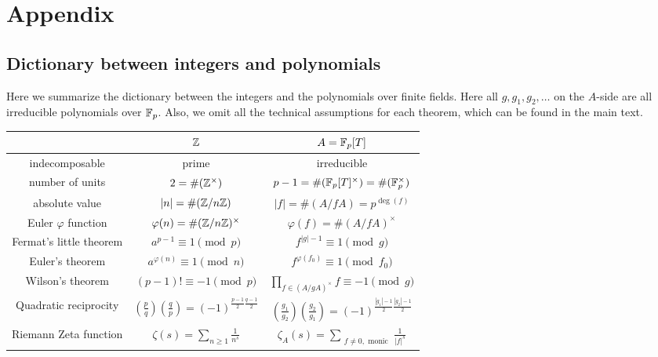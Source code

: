 \appendix
\section{Appendix}


\subsection{Dictionary between integers and polynomials}
\label{subsec:dictionary}

Here we summarize the dictionary between the integers and the polynomials over finite fields.
Here all $g, g_1, g_2, \dots$ on the $A$-side are all irreducible polynomials over $\mathbb{F}_p$.
Also, we omit all the technical assumptions for each theorem, which can be found in the main text.

\begin{table}[h]
    \begin{center}
        \begin{tabular}{c|c|c}
            \toprule
            & $\mathbb{Z}$ & $A = \mathbb{F}_p[T]$ \\
            \midrule
            indecomposable & prime & irreducible \\
            number of units &$2 = \#(\mathbb{Z}^\times)$ & $p - 1 = \# (\mathbb{F}_p[T]^\times) = \# (\mathbb{F}_p^\times)$ \\
            absolute value & $|n| = \# (\mathbb{Z} / n\mathbb{Z})$ & $|f| = \# (A / f A) = p^{\deg (f)}$ \\
            Euler $\varphi$ function & $\varphi(n) = \# (\mathbb{Z} / n \mathbb{Z})^\times$ & $\varphi(f) = \# (A / fA)^\times$ \\
            Fermat's little theorem & $a^{p-1} \equiv 1 \pmod{p}$ & $f^{|g| - 1} \equiv 1 \pmod{g}$ \\
            Euler's theorem & $a^{\varphi(n)} \equiv 1 \pmod{n}$ & $f^{\varphi(f_0)} \equiv 1 \pmod{f_0}$ \\
            Wilson's theorem & $(p-1)! \equiv -1 \pmod{p}$ & $\prod_{f \in (A / g A)^\times} f \equiv -1 \pmod{g}$ \\
            Quadratic reciprocity & $\left(\frac{p}{q}\right)\left(\frac{q}{p}\right) = (-1)^{\frac{p-1}{2}\frac{q-1}{2}}$ & $\left(\frac{g_1}{g_2}\right)\left(\frac{g_2}{g_1}\right) = (-1)^{\frac{|g_1| - 1}{2}\frac{|g_2| - 1}{2}}$\\
            Riemann Zeta function & $\zeta(s) = \sum_{n \ge 1}\frac{1}{n^s}$ & $\zeta_{A}(s) = \sum_{\substack{f \ne 0, \text{ monic}}} \frac{1}{|f|^s}$ \\

\end{tabular}
\end{center}
\end{table}
